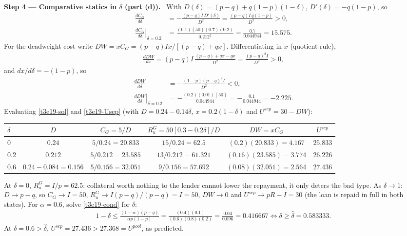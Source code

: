\documentclass[11pt,a4paper]{article}
\newcommand{\step}[2]{\par\medskip\noindent\textbf{Step #1 --- #2.}~}
\begin{document}
\step{4}{Comparative statics in $\delta$ (part (d))} With $D(\delta)=(p-q)+q(1-p)(1-\delta)$, $D'(\delta)=-q(1-p)$, so
\begin{align}
  \frac{dC_G}{d\delta} &= -\frac{(p-q)I\,D'(\delta)}{D^2} = \frac{(p-q)I\,q(1-p)}{D^2} > 0, \nonumber\\
  \left.\frac{dC_G}{d\delta}\right|_{\delta=0.2} &= \frac{(0.1)(50)(0.7)(0.2)}{0.212^2} = \frac{0.7}{0.044944} = 15.575. \nonumber
\end{align}
For the deadweight cost write $DW=xC_G=(p-q)Ix/[(p-q)+qx]$. Differentiating in $x$ (quotient rule),
\begin{align}
  \frac{dDW}{dx} = (p-q)I\,\frac{(p-q)+qx-qx}{D^2} = \frac{(p-q)^2I}{D^2} > 0, \nonumber
\end{align}
and $dx/d\delta=-(1-p)$, so
\begin{align}
  \frac{dDW}{d\delta} &= -\frac{(1-p)(p-q)^2I}{D^2} < 0, \nonumber\\
  \left.\frac{dDW}{d\delta}\right|_{\delta=0.2} &= -\frac{(0.2)(0.01)(50)}{0.044944} = -\frac{0.1}{0.044944} = -2.225. \nonumber
\end{align}
Evaluating \eqref{t3e19-sol} and \eqref{t3e19-Usep} (with $D=0.24-0.14\delta$, $x=0.2(1-\delta)$ and $U^{sep}=30-DW$):
\begin{center}\small
\begin{tabular}{@{}lccccc@{}}
\toprule
$\delta$ & $D$ & $C_G=5/D$ & $R_u^G=50[0.3-0.2\delta]/D$ & $DW=xC_G$ & $U^{sep}$\\
\midrule
0 & $0.24$ & $5/0.24=20.833$ & $15/0.24=62.5$ & $(0.2)(20.833)=4.167$ & $25.833$\\
0.2 & $0.212$ & $5/0.212=23.585$ & $13/0.212=61.321$ & $(0.16)(23.585)=3.774$ & $26.226$\\
0.6 & $0.24-0.084=0.156$ & $5/0.156=32.051$ & $9/0.156=57.692$ & $(0.08)(32.051)=2.564$ & $27.436$\\
\bottomrule
\end{tabular}
\end{center}
At $\delta=0$, $R_u^G=I/p=62.5$: collateral worth nothing to the lender cannot lower the repayment, it only deters the bad type.
As $\delta\to1$: $D\to p-q$, so $C_G\to I=50$, $R_u^G\to I(p-q)/(p-q)=I=50$, $DW\to0$ and $U^{sep}\to pR-I=30$ (the loan is repaid in full in both states). For $\alpha=0.6$, solve \eqref{t3e19-cond} for $\delta$:
\begin{align}
  1-\delta \le \frac{(1-\alpha)(p-q)}{\alpha p(1-p)} = \frac{(0.4)(0.1)}{(0.6)(0.8)(0.2)} = \frac{0.04}{0.096} = 0.416667 \iff \delta \ge \hat\delta = 0.583333. \nonumber
\end{align}
At $\delta=0.6>\hat\delta$, $U^{sep}=27.436>27.368=U^{pool}$, as predicted.
\end{document}
